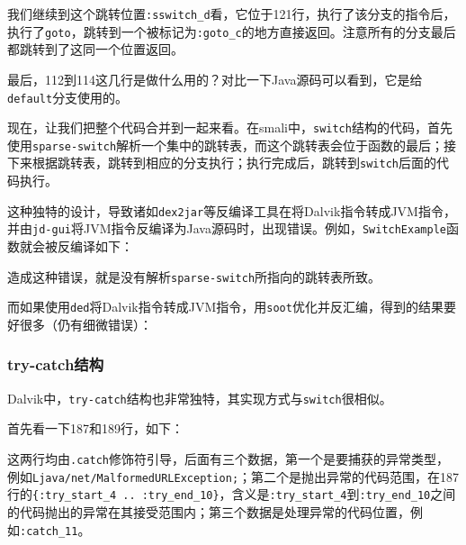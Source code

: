 我们继续到这个跳转位置\lstinline!:sswitch_d!看，它位于121行，执行了该分支的指令后，执行了\lstinline!goto!，跳转到一个被标记为\lstinline!:goto_c!的地方直接返回。注意所有的分支最后都跳转到了这同一个位置返回。

最后，112到114这几行是做什么用的？对比一下Java源码可以看到，它是给\lstinline!default!分支使用的。

现在，让我们把整个代码合并到一起来看。在smali中，\lstinline!switch!结构的代码，首先使用\lstinline!sparse-switch!解析一个集中的跳转表，而这个跳转表会位于函数的最后；接下来根据跳转表，跳转到相应的分支执行；执行完成后，跳转到\lstinline!switch!后面的代码执行。

这种独特的设计，导致诸如\lstinline!dex2jar!等反编译工具在将Dalvik指令转成JVM指令，并由\lstinline!jd-gui!将JVM指令反编译为Java源码时，出现错误。例如，\lstinline!SwitchExample!函数就会被反编译如下：

造成这种错误，就是没有解析\lstinline!sparse-switch!所指向的跳转表所致。

而如果使用\lstinline!ded!将Dalvik指令转成JVM指令，用\lstinline!soot!优化并反汇编，得到的结果要好很多（仍有细微错误）：


\subsubsection{try-catch结构}



Dalvik中，\lstinline!try-catch!结构也非常独特，其实现方式与\lstinline!switch!很相似。

首先看一下187和189行，如下：


这两行均由\lstinline!.catch!修饰符引导，后面有三个数据，第一个是要捕获的异常类型，例如\lstinline!Ljava/net/MalformedURLException;!；第二个是抛出异常的代码范围，在187行的\lstinline!{:try_start_4 .. :try_end_10}!，含义是\lstinline!:try_start_4!到\lstinline!:try_end_10!之间的代码抛出的异常在其接受范围内；第三个数据是处理异常的代码位置，例如\lstinline!:catch_11!。

